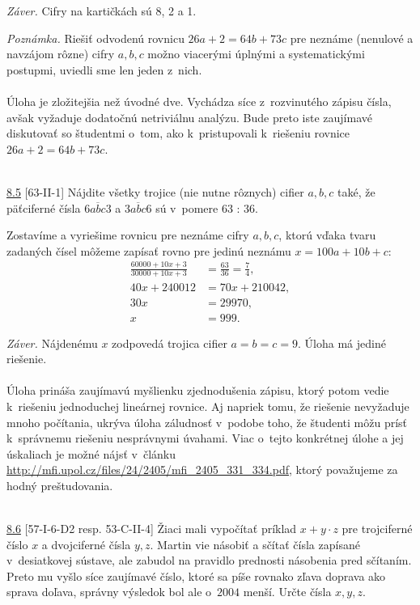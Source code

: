 \textit{Záver.} Cifry na kartičkách sú 8, 2 a 1.

\textit{Poznámka.} Riešiť odvodenú rovnicu $26a + 2 = 64b + 73c$ pre neznáme (nenulové a navzájom rôzne) cifry $a, b, c$ možno viacerými úplnými a systematickými postupmi, uviedli sme len jeden z~nich.\\
\\
\kom Úloha je zložitejšia než úvodné dve. Vychádza síce z~rozvinutého zápisu čísla, avšak vyžaduje dodatočnú netriviálnu analýzu. Bude preto iste zaujímavé diskutovať so študentmi o~tom, ako k~pristupovali k~riešeniu rovnice $26a + 2 = 64b + 73c$. \\
\\
\begin{tcolorbox}[breakable,notitle,boxrule=0pt,colback=light-gray,colframe=light-gray]\ul{8.5} [63-II-1]
Nájdite všetky trojice (nie nutne rôznych) cifier $a, b, c$ také, že päťciferné čísla $\overline{6abc3}$ a $\overline{3abc6}$ sú v~pomere 63 : 36.

\end{tcolorbox}

\rie Zostavíme a vyriešime rovnicu pre neznáme cifry $a, b, c$, ktorú vďaka tvaru zadaných čísel môžeme zapísať rovno pre jedinú neznámu $x = 100a + 10b + c$:
\begin{align*}
\frac{60000+10x+3}{30000+10x+3} &=\frac{63}{36}=\frac{7}{4},\\
40x + 240 012 &= 70x + 210 042,\\
30x &= 29 970,\\
x &= 999.
\end{align*}

\textit{Záver.} Nájdenému $x$ zodpovedá trojica cifier $a = b = c = 9$. Úloha má jediné riešenie.\\
\\
\kom Úloha prináša zaujímavú myšlienku zjednodušenia zápisu, ktorý potom vedie k~riešeniu jednoduchej lineárnej rovnice. Aj napriek tomu, že riešenie nevyžaduje mnoho počítania, ukrýva úloha záludnosť v~podobe toho, že študenti môžu prísť k~správnemu riešeniu nesprávnymi úvahami. Viac o~tejto konkrétnej úlohe a jej úskaliach je možné nájsť v~článku \url{http://mfi.upol.cz/files/24/2405/mfi_2405_331_334.pdf}, ktorý považujeme za hodný preštudovania.\\
\\
\begin{tcolorbox}[breakable,notitle,boxrule=0pt,colback=light-gray,colframe=light-gray]\ul{8.6} [57-I-6-D2 resp. 53-C-II-4]  Žiaci mali vypočítať príklad $x + y \cdot z$ pre trojciferné číslo $x$ a dvojciferné čísla $y, z$. Martin vie násobiť a sčítať čísla zapísané v~desiatkovej sústave, ale zabudol na pravidlo prednosti násobenia pred sčítaním. Preto mu vyšlo síce zaujímavé číslo, ktoré sa píše rovnako zľava doprava ako sprava doľava, správny výsledok bol ale o~$2 004$ menší. Určte čísla $x, y, z$.

\end{tcolorbox}

